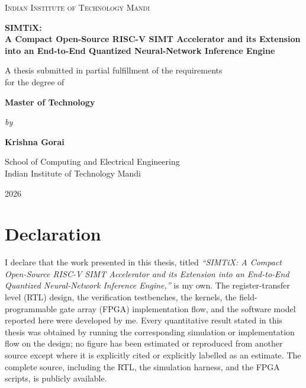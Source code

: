 \documentclass[12pt,a4paper,oneside]{report}
\begin{document}
\begin{titlepage}
\centering
\vspace*{0.5cm}
{\large\scshape Indian Institute of Technology Mandi\par}
\vspace{2.0cm}
{\Large\bfseries SIMTiX:\\[0.3em]
A Compact Open-Source RISC-V SIMT Accelerator and its Extension\\
into an End-to-End Quantized Neural-Network Inference Engine\par}
\vspace{2.0cm}
{\large A thesis submitted in partial fulfillment of the requirements\\
for the degree of\par}
\vspace{0.4cm}
{\large\bfseries Master of Technology\par}
\vspace{2.0cm}
{\large\itshape by\par}
\vspace{0.4cm}
{\Large\bfseries Krishna Gorai\par}
\vspace{3.0cm}
{\large School of Computing and Electrical Engineering\\
Indian Institute of Technology Mandi\par}
\vspace{1.5cm}
{\large 2026\par}
\end{titlepage}

\chapter*{Declaration}
\thispagestyle{plain}

I declare that the work presented in this thesis, titled \emph{``SIMTiX: A
Compact Open-Source RISC-V SIMT Accelerator and its Extension into an End-to-End
Quantized Neural-Network Inference Engine,''} is my own. The register-transfer
level (RTL) design, the verification testbenches, the kernels, the field-programmable
gate array (FPGA) implementation flow, and the software model reported here were
developed by me. Every quantitative result stated in this thesis was obtained by
running the corresponding simulation or implementation flow on the design; no
figure has been estimated or reproduced from another source except where it is
explicitly cited or explicitly labelled as an estimate. The complete source,
including the RTL, the simulation harness, and the FPGA scripts, is publicly
available.
\end{document}
